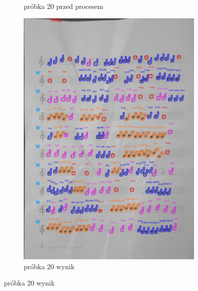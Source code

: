 \documentclass[11pt]{article}
\begin{document}
\begin{figure}
\begin{subfigure}[b]{0.475\textwidth}
        \caption[]%
        {{\small próbka 20 przed procesem}}
        \label{fig:sub3}
    \end{subfigure}
    \quad
    \begin{subfigure}[b]{0.475\textwidth}
        \centering
        \graphicspath{ {blobs/} }
        \includegraphics[width=\textwidth]{20_cnts.jpg}
        \caption[]%
        {{\small próbka 20 wynik}}
        \label{fig:sub 4}
    \end{subfigure}
    \label{fig 3}
\end{figure}

\FloatBarrier
\end{document}

